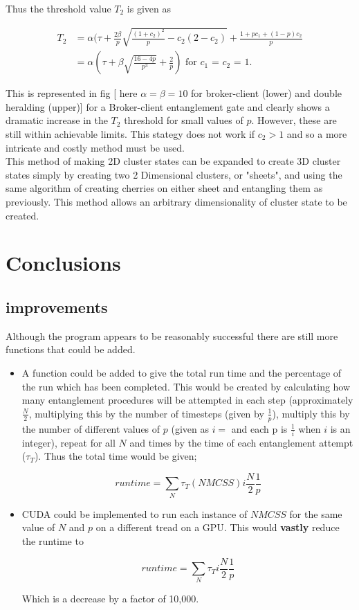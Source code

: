 \documentclass{article}
\numberwithin{equation}{section} %
\begin{document}
   Thus the threshold value $T_2$ is given as

\begin{align}
T_2 &= \alpha (\tau +\frac{2\beta}{p}\sqrt{\frac{(1+c_2)^2}{p}-c_2(2-c_2)}+\frac{1+pc_1+(1-p)c_2}{p} \\
&= \alpha (\tau + \beta \sqrt{\frac{16-4p}{p^3}}+\frac{2}{p}) \text{   for $c_1$ = $c_2$ = 1.}
\end{align}  
 
 This is represented in fig [ here $\alpha = \beta =10$ for broker-client (lower) and double heralding (upper)] for a Broker-client entanglement gate and clearly shows a dramatic increase in the $T_2$ threshold for small values of $p$. However, these are still within achievable limits. This stategy does not work if $c_2 > 1$ and so a more intricate and costly method must be used. \\
 
 This method of making 2D cluster states can be expanded to create 3D cluster states simply by creating two 2 Dimensional clusters, or "sheets", and using the same algorithm of creating cherries on either sheet and entangling them as previously. This method allows an arbitrary dimensionality of cluster state to be created.
 
\section{Conclusions}

\subsection{improvements}
Although the program appears to be reasonably successful there are still more functions that could be added.
\begin{itemize}
\item A function could be added to give the total run time and the percentage of the run which has been completed. This would be created by calculating how many entanglement procedures will be attempted in each step (approximately $\frac{N}{2}$, multiplying this by the number of timesteps (given by $\frac{1}{p}$), multiply this by the number of different values of $p$ (given as $i =$ and each p is $\frac{1}{i}$ when $i$ is an integer), repeat for all $N$ and times by the time of each entanglement attempt ($\tau _T $). Thus the total time would be given;

\begin{equation}
runtime= \sum _N {\tau _T (NMCSS) i\frac{N}{2}\frac{1}{p}}
\end{equation}


\item CUDA could be implemented to run each instance of $NMCSS$ for the same value of $N$ and $p$ on a different tread on a GPU. This would \textbf{vastly} reduce the runtime to

\begin{equation}
runtime= \sum _N {\tau _T i\frac{N}{2}\frac{1}{p}}
\end{equation}

Which is a decrease by a factor of 10,000. 
\end{itemize}
\end{document}
